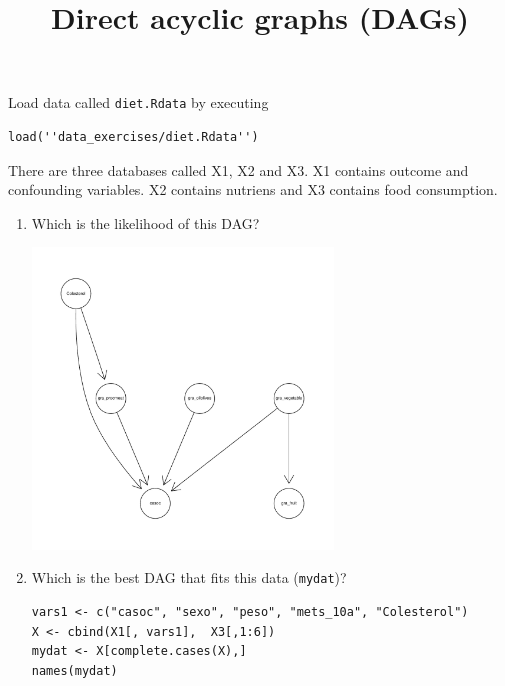 \documentclass[11pt]{article}
\begin{document}
\title{\bf Direct acyclic graphs (DAGs)}
\date{}


\maketitle




 Load data called {\tt diet.Rdata} by executing 

\begin{verbatim}
load(''data_exercises/diet.Rdata'')
\end{verbatim}

\noindent There are three databases called X1, X2 and X3. X1 contains outcome and confounding variables. X2 contains nutriens and X3 contains food consumption. 

\begin{enumerate}
\item Which is the likelihood of this DAG?

\begin{center}
 \includegraphics[width=8cm, height=8cm]{DAG}
\end{center}

\item Which is the best DAG that fits this data ({\tt mydat})?

\begin{verbatim}
vars1 <- c("casoc", "sexo", "peso", "mets_10a", "Colesterol")
X <- cbind(X1[, vars1],  X3[,1:6])
mydat <- X[complete.cases(X),]
names(mydat)
\end{verbatim}

\end{enumerate}
\end{document}
